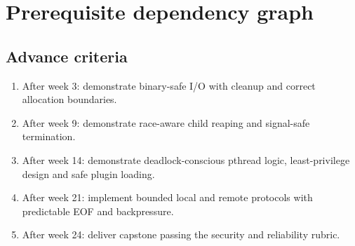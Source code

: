 \documentclass[11pt,letterpaper,oneside]{report}
\begin{document}
\chapter{Prerequisite dependency graph}
\begin{center}
\end{center}\section{Advance criteria}
\begin{enumerate}
\item After week 3: demonstrate binary-safe I/O with cleanup and correct allocation boundaries.
\item After week 9: demonstrate race-aware child reaping and signal-safe termination.
\item After week 14: demonstrate deadlock-conscious pthread logic, least-privilege design and safe plugin loading.
\item After week 21: implement bounded local and remote protocols with predictable EOF and backpressure.
\item After week 24: deliver capstone passing the security and reliability rubric.
\end{enumerate}
\end{document}

